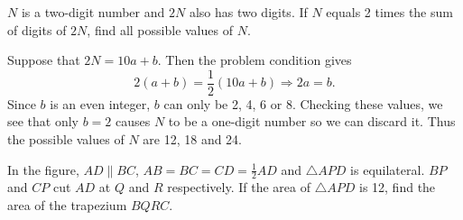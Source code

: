 \begin{question}
    $N$ is a two-digit number and $2N$ also has two digits. If $N$ equals 2
    times the sum of digits of $2N$, find all possible values of $N$.
\end{question}
\begin{solution}
    Suppose that $2N = 10a + b$. Then the problem condition gives
    \[ 2(a + b) = \frac{1}{2}(10a + b) \Longrightarrow 2a = b. \]
    Since $b$ is an even integer, $b$ can only be 2, 4, 6 or 8. Checking these
    values, we see that only $b = 2$ causes $N$ to be a one-digit number so we
    can discard it. Thus the possible values of $N$ are 12, 18 and 24.
\end{solution}
\begin{question}
    In the figure, $AD \parallel BC$, $AB = BC = CD = \frac{1}{2}AD$ and
    $\triangle APD$ is equilateral. $BP$ and $CP$ cut $AD$ at $Q$ and $R$
    respectively. If the area of $\triangle APD$ is 12, find the area of the
    trapezium $BQRC$.
\end{question}
